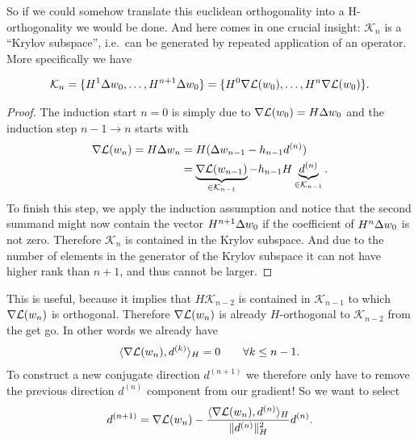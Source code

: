 So if we could somehow translate this euclidean orthogonality into a
H-orthogonality we would be done. And here comes in one crucial insight:
\(\mathcal{K}_n\) is a ``Krylov subspace'', i.e.\ can be generated by repeated
application of an operator. More specifically we have
\begin{lemma}
	\begin{align*}
		\mathcal{K}_n
		= \{H^1 \Delta w_0, \dots, H^{n+1}\Delta w_0\}
		= \{H^0 \nabla\mathcal{L}(w_0), \dots, H^n\nabla\mathcal{L}(w_0)\}.
	\end{align*}
\end{lemma}
\begin{proof}
	The induction start \(n=0\) is simply due to \(\nabla\mathcal{L}(w_0) =
	H\Delta w_0\) and the induction step \(n-1\to n\) starts with
	\begin{align}
		\nonumber
		\nabla\mathcal{L}(w_n)= H\Delta w_n
		&= H(\Delta w_{n-1} - h_{n-1} d^{(n)})\\
		\label{eq: represent nabla Loss(weights_n) with prev gradient and d(n)}
		&= \underbrace{\nabla\mathcal{L}(w_{n-1})}_{\in \mathcal{K}_{n-1}} - h_{n-1} H
		\underbrace{d^{(n)}}_{\in \mathcal{K}_{n-1}}.
	\end{align}
	To finish this step, we apply the induction assumption and notice that the
	second summand might now contain the vector \(H^{n+1}\Delta w_0\) if the
	coefficient of \(H^{n}\Delta w_0\) is not zero. Therefore
	\(\mathcal{K}_{n}\) is contained in the Krylov subspace. And due to the
	number of elements in the generator of the Krylov subspace it can not have
	higher rank than \(n+1\), and thus cannot be larger.
\end{proof}
This is useful, because it implies that \(H\mathcal{K}_{n-2}\) is contained
in \(\mathcal{K}_{n-1}\) to which \(\nabla\mathcal{L}(w_n)\) is orthogonal.
Therefore \(\nabla\mathcal{L}(w_n)\) is already \(H\)-orthogonal to
\(\mathcal{K}_{n-2}\) from the get go. In other words we already have
\begin{align*}
	\langle \nabla\mathcal{L}(w_n), d^{(k)} \rangle_H = 0 
	\qquad \forall k\le n-1.
\end{align*}
To construct a new conjugate direction \(d^{(n+1)}\) we therefore only have to
remove the previous direction \(d^{(n)}\) component from our gradient! So we
want to select
\begin{align}\label{eq: next search direction}
	d^{(n+1)} = \nabla\mathcal{L}(w_n)
	- \frac{\langle \nabla\mathcal{L}(w_n), d^{(n)}\rangle_H}{\|d^{(n)}\|_H^2}d^{(n)}.
\end{align}

